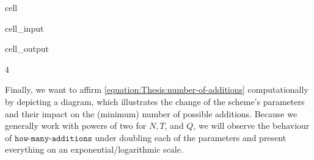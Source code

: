 \documentclass[letterpaper,10pt,english]{jupyterBook}
\begin{document}
\begin{sphinxuseclass}{cell}\begin{sphinxVerbatimInput}

\begin{sphinxuseclass}{cell_input}
\begin{sphinxVerbatim}[commandchars=\\\{\}]
    
\end{sphinxVerbatim}

\end{sphinxuseclass}\end{sphinxVerbatimInput}
\begin{sphinxVerbatimOutput}

\begin{sphinxuseclass}{cell_output}
\begin{sphinxVerbatim}[commandchars=\\\{\}]
4
\end{sphinxVerbatim}

\end{sphinxuseclass}\end{sphinxVerbatimOutput}

\end{sphinxuseclass}\label{\detokenize{Thesis:parameter-impact}}
\begin{DUlineblock}{0em}
\item[] 
\end{DUlineblock}

\sphinxAtStartPar
Finally, we want to affirm \eqref{equation:Thesis:number-of-additions} computationally by depicting a diagram, which illustrates the change of the scheme’s parameters and their impact on the (minimum) number of possible additions.
Because we generally work with powers of two for \(N, T\), and \(Q\), we will observe the behaviour of \(\texttt{how-many-additions}\) under doubling each of the parameters and present everything on an exponential/logarithmic scale.
\end{document}
